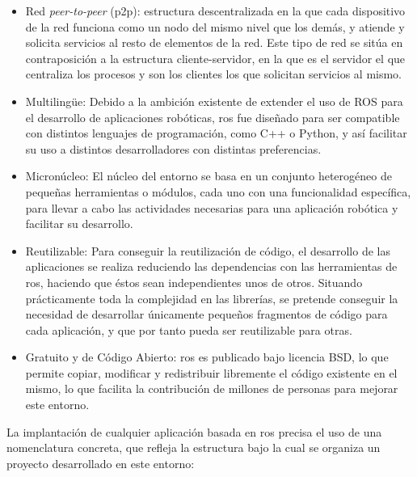 \begin{itemize}

\item Red \emph{peer-to-peer} (\acrshort{p2p}): estructura descentralizada en la que cada dispositivo de la red funciona como un nodo del mismo nivel que los demás, y atiende y solicita servicios al resto de elementos de la red. Este tipo de red se sitúa en contraposición a la estructura cliente-servidor, en la que es el servidor el que centraliza los procesos y son los clientes los que solicitan servicios al mismo. \par 

\item Multilingüe: Debido a la ambición existente de extender el uso de ROS para el desarrollo de aplicaciones robóticas, \acrshort{ros} fue diseñado para ser compatible con distintos lenguajes de programación, como C++ o Python, y así facilitar su uso a distintos desarrolladores con distintas preferencias. \par 

\item Micronúcleo: El núcleo del entorno se basa en un conjunto heterogéneo de pequeñas herramientas o módulos, cada uno con una funcionalidad específica, para llevar a cabo las actividades necesarias para una aplicación robótica y facilitar su desarrollo. \par 

\item Reutilizable: Para conseguir la reutilización de código, el desarrollo de las aplicaciones se realiza reduciendo las dependencias con las herramientas de \acrshort{ros}, haciendo que éstos sean independientes unos de otros. Situando prácticamente toda la complejidad en las librerías, se pretende conseguir la necesidad de desarrollar únicamente pequeños fragmentos de código para cada aplicación, y que por tanto pueda ser reutilizable para otras. \par 

\item Gratuito y de Código Abierto: \acrshort{ros} es publicado bajo licencia BSD, lo que permite copiar, modificar y redistribuir libremente el código existente en el mismo, lo que facilita la contribución de millones de personas para mejorar este entorno. \par 

\end{itemize}

La implantación de cualquier aplicación basada en \acrshort{ros} precisa el uso de una nomenclatura concreta, que refleja la estructura bajo la cual se organiza un proyecto desarrollado en este entorno:

